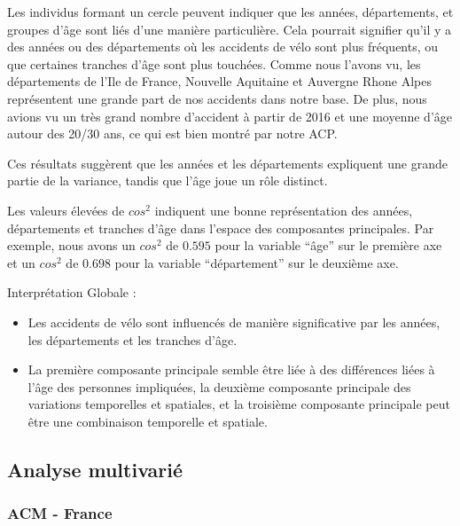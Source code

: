 \documentclass[french,]{compterendu}
\providecommand{\tightlist}{%
  \setlength{\itemsep}{0pt}\setlength{\parskip}{0pt}}
\theoremstyle{urcastyle}
\theoremstyle{remark}
\begin{document}
Les individus formant un cercle peuvent indiquer que les années, départements, et groupes d'âge sont liés d'une manière particulière. Cela pourrait signifier qu'il y a des années ou des départements où les accidents de vélo sont plus fréquents, ou que certaines tranches d'âge sont plus touchées. Comme nous l'avons vu, les départements de l'Ile de France, Nouvelle Aquitaine et Auvergne Rhone Alpes représentent une grande part de nos accidents dans notre base. De plus, nous avions vu un très grand nombre d'accident à partir de 2016 et une moyenne d'âge autour des 20/30 ans, ce qui est bien montré par notre ACP.

Ces résultats suggèrent que les années et les départements expliquent une grande partie de la variance, tandis que l'âge joue un rôle distinct.

Les valeurs élevées de \(cos^2\) indiquent une bonne représentation des années, départements et tranches d'âge dans l'espace des composantes principales. Par exemple, nous avons un \(cos^2\) de \(0.595\) pour la variable ``âge'' sur le première axe et un \(cos^2\) de \(0.698\) pour la variable ``département'' sur le deuxième axe.

Interprétation Globale :

\begin{itemize}
\tightlist
\item
  Les accidents de vélo sont influencés de manière significative par les années, les départements et les tranches d'âge.
\item
  La première composante principale semble être liée à des différences liées à l'âge des personnes impliquées, la deuxième composante principale des variations temporelles et spatiales, et la troisième composante principale peut être une combinaison temporelle et spatiale.
\end{itemize}

\hypertarget{analyse-multivariuxe9}{%
\subsection{Analyse multivarié}\label{analyse-multivariuxe9}}

\hypertarget{acm---france}{%
\subsubsection{ACM - France}\label{acm---france}}
\end{document}
